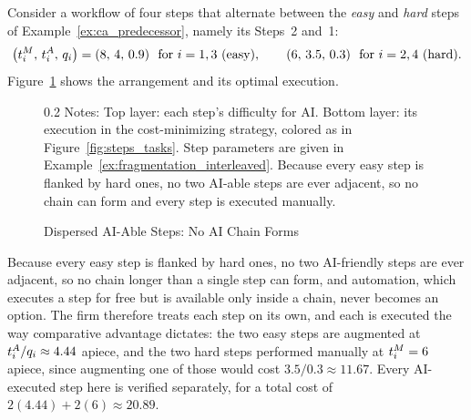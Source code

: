 \begin{example}
\label{ex:fragmentation_interleaved}
Consider a workflow of four steps that alternate between the \emph{easy} and \emph{hard} steps of Example~\ref{ex:ca_predecessor}, namely its Steps~2 and~1:
\[ \bigl(t^{M}_{i},\, t^{A}_{i},\, q_i\bigr) = (8,\,4,\,0.9) \ \text{ for $i = 1, 3$ (easy)}, \qquad (6,\,3.5,\,0.3) \ \text{ for $i = 2, 4$ (hard)}. \]
Figure~\ref{fig:ex_dispersed} shows the arrangement and its optimal execution.
\begin{figure}[!t]
\caption{Dispersed AI-Able Steps: No AI Chain Forms}
\label{fig:ex_dispersed}
\centering

\par\vspace{\fignotesskip}
\begin{minipage}{1\linewidth}
\begin{spacing}{0.2}
{\fontsize{9.5pt}{10pt}\selectfont Notes: Top layer: each step's difficulty for AI. Bottom layer: its execution in the cost-minimizing strategy, colored as in Figure~\ref{fig:steps_tasks}. Step parameters are given in Example~\ref{ex:fragmentation_interleaved}. Because every easy step is flanked by hard ones, no two AI-able steps are ever adjacent, so no chain can form and every step is executed manually.}
\end{spacing}
\end{minipage}
\end{figure}

Because every easy step is flanked by hard ones, no two AI-friendly steps are ever adjacent, so no chain longer than a single step can form, and automation, which executes a step for free but is available only inside a chain, never becomes an option.
The firm therefore treats each step on its own, and each is executed the way comparative advantage dictates: the two easy steps are augmented at $t^{A}_{i}/q_i \approx 4.44$ apiece, and the two hard steps performed manually at $t^{M}_{i} = 6$ apiece, since augmenting one of those would cost $3.5/0.3 \approx 11.67$.
Every AI-executed step here is verified separately, for a total cost of $2(4.44) + 2(6) \approx 20.89$.
\end{example}
